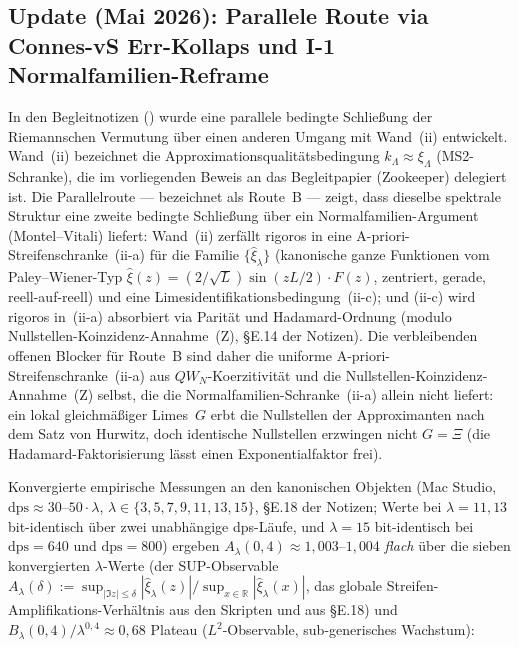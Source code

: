 \documentclass[11pt,a4paper]{article}
\theoremstyle{remark}
\theoremstyle{plain}
\begin{document}
\subsection{Update (Mai 2026): Parallele Route via Connes-vS Err-Kollaps und I-1 Normalfamilien-Reframe}
\label{sec:route-b-parallel}

In den Begleitnotizen ()
wurde eine parallele bedingte Schließung der Riemannschen Vermutung
über einen anderen Umgang mit Wand~(ii) entwickelt.
Wand~(ii) bezeichnet die Approximationsqualitätsbedingung
$k_\Lambda \approx \xi_\Lambda$ (MS2-Schranke), die im vorliegenden
Beweis an das Begleitpapier (Zookeeper) delegiert ist.
Die Parallelroute --- bezeichnet als Route~B --- zeigt, dass dieselbe
spektrale Struktur eine zweite bedingte Schließung über ein
Normalfamilien-Argument (Montel--Vitali) liefert: Wand~(ii) zerfällt
rigoros in eine A-priori-Streifenschranke~(ii-a) für die Familie
$\{\hat\xi_\lambda\}$ (kanonische ganze Funktionen vom Paley--Wiener-Typ
$\hat\xi(z) = (2/\sqrt L)\sin(zL/2)\cdot F(z)$, zentriert, gerade,
reell-auf-reell) und eine Limesidentifikationsbedingung~(ii-c); und
(ii-c) wird rigoros in~(ii-a) absorbiert via Parität und Hadamard-Ordnung
(modulo Nullstellen-Koinzidenz-Annahme~(Z), §E.14 der Notizen).
Die verbleibenden offenen Blocker für Route~B sind daher die
uniforme A-priori-Streifenschranke~(ii-a) aus $QW_N$-Koerzitivität
und die Nullstellen-Koinzidenz-Annahme~(Z) selbst, die die
Normalfamilien-Schranke~(ii-a) allein nicht liefert: ein lokal
gleichmäßiger Limes~$G$ erbt die Nullstellen der Approximanten
nach dem Satz von Hurwitz, doch identische Nullstellen erzwingen
nicht $G=\Xi$ (die Hadamard-Faktorisierung lässt einen
Exponentialfaktor frei).

Konvergierte empirische Messungen an den kanonischen Objekten (Mac Studio,
$\mathrm{dps} \approx 30\text{--}50\cdot\lambda$, $\lambda \in
\{3,5,7,9,11,13,15\}$, §E.18 der Notizen; Werte bei $\lambda=11,13$
bit-identisch über zwei unabhängige dps-Läufe, und $\lambda=15$
bit-identisch bei $\mathrm{dps}=640$ und $\mathrm{dps}=800$) ergeben
$A_\lambda(0{,}4) \approx 1{,}003\text{--}1{,}004$ \emph{flach} über die
sieben konvergierten $\lambda$-Werte (der SUP-Observable
$A_\lambda(\delta) :=
\sup_{|\Im z|\leq \delta}|\hat\xi_\lambda(z)|/
\sup_{x\in\mathbb{R}}|\hat\xi_\lambda(x)|$, das globale
Streifen-Amplifikations-Verhältnis aus den Skripten und aus §E.18) und
$B_\lambda(0{,}4)/\lambda^{0{,}4}
\approx 0{,}68$ Plateau ($L^2$-Observable, sub-generisches Wachstum):
\end{document}
